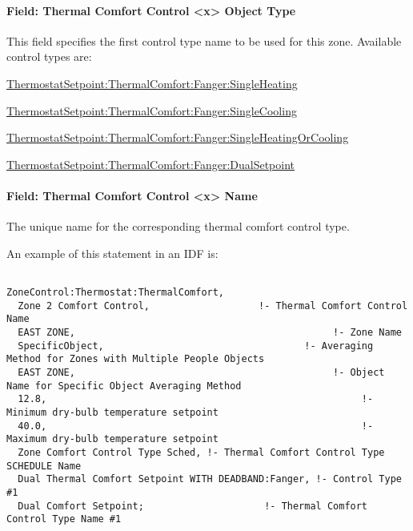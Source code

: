 \paragraph{Field: Thermal Comfort Control \textless{}x\textgreater{} Object Type}\label{field-thermal-comfort-control-x-object-type}

This field specifies the first control type name to be used for this zone. Available control types are:

\hyperref[thermostatsetpointthermalcomfortfangersingleheating]{ThermostatSetpoint:ThermalComfort:Fanger:SingleHeating}

\hyperref[thermostatsetpointthermalcomfortfangersinglecooling]{ThermostatSetpoint:ThermalComfort:Fanger:SingleCooling}

\hyperref[thermostatsetpointthermalcomfortfangersingleheatingorcooling]{ThermostatSetpoint:ThermalComfort:Fanger:SingleHeatingOrCooling}

\hyperref[thermostatsetpointthermalcomfortfangerdualsetpoint]{ThermostatSetpoint:ThermalComfort:Fanger:DualSetpoint}

\paragraph{Field: Thermal Comfort Control \textless{}x\textgreater{} Name}\label{field-thermal-comfort-control-x-name}

The unique name for the corresponding thermal comfort control type.

An example of this statement in an IDF is:

\begin{lstlisting}

ZoneControl:Thermostat:ThermalComfort,
  Zone 2 Comfort Control,                   !- Thermal Comfort Control Name
  EAST ZONE,                                             !- Zone Name
  SpecificObject,                                   !- Averaging Method for Zones with Multiple People Objects
  EAST ZONE,                                             !- Object Name for Specific Object Averaging Method
  12.8,                                                       !- Minimum dry-bulb temperature setpoint
  40.0,                                                       !- Maximum dry-bulb temperature setpoint
  Zone Comfort Control Type Sched, !- Thermal Comfort Control Type SCHEDULE Name
  Dual Thermal Comfort Setpoint WITH DEADBAND:Fanger, !- Control Type #1
  Dual Comfort Setpoint;                     !- Thermal Comfort Control Type Name #1
\end{lstlisting}

